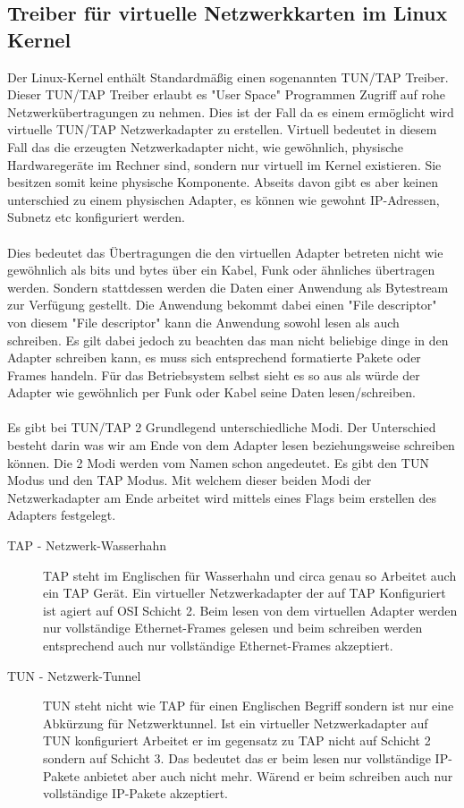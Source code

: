 \subsection{Treiber für virtuelle Netzwerkkarten im Linux Kernel}
Der Linux-Kernel enthält Standardmäßig einen sogenannten TUN/TAP Treiber. Dieser TUN/TAP Treiber erlaubt es "User Space" Programmen Zugriff auf rohe Netzwerkübertragungen zu nehmen. Dies ist der Fall da es einem ermöglicht wird virtuelle TUN/TAP Netzwerkadapter zu erstellen.
Virtuell bedeutet in diesem Fall das die erzeugten Netzwerkadapter nicht, wie gewöhnlich, physische Hardwaregeräte im Rechner sind, sondern nur virtuell im Kernel existieren. Sie besitzen somit keine physische Komponente. Abseits davon gibt es aber keinen unterschied zu einem physischen Adapter, es können wie gewohnt IP-Adressen, Subnetz etc konfiguriert werden.
\\\\
Dies bedeutet das Übertragungen die den virtuellen Adapter betreten nicht wie gewöhnlich als bits und bytes über ein Kabel, Funk oder ähnliches übertragen werden. Sondern stattdessen werden die Daten einer Anwendung als Bytestream zur Verfügung gestellt. Die Anwendung bekommt dabei einen "File descriptor" von diesem "File descriptor" kann die Anwendung sowohl lesen als auch schreiben. Es gilt dabei jedoch zu beachten das man nicht beliebige dinge in den Adapter schreiben kann, es muss sich entsprechend formatierte Pakete oder Frames handeln. Für das Betriebsystem selbst sieht es so aus als würde der Adapter wie gewöhnlich per Funk oder Kabel seine Daten lesen/schreiben.
\\\\
Es gibt bei TUN/TAP 2 Grundlegend unterschiedliche Modi. Der Unterschied besteht darin was wir am Ende von dem Adapter lesen beziehungsweise schreiben können. Die 2 Modi werden vom Namen schon angedeutet. Es gibt den TUN Modus und den TAP Modus. Mit welchem dieser beiden Modi der Netzwerkadapter am Ende arbeitet wird mittels eines Flags beim erstellen des Adapters festgelegt.
\\
\begin{description}
    \item[TAP - Netzwerk-Wasserhahn] TAP steht im Englischen für Wasserhahn und circa genau so Arbeitet auch ein TAP Gerät.
    Ein virtueller Netzwerkadapter der auf TAP Konfiguriert ist agiert auf OSI Schicht 2. 
    Beim lesen von dem virtuellen Adapter werden nur vollständige Ethernet-Frames gelesen und beim schreiben werden entsprechend auch nur vollständige Ethernet-Frames akzeptiert.
    \\
    \item[TUN - Netzwerk-Tunnel] TUN steht nicht wie TAP für einen Englischen Begriff sondern ist nur eine Abkürzung für Netzwerktunnel. 
    Ist ein virtueller Netzwerkadapter auf TUN konfiguriert Arbeitet er im gegensatz zu TAP nicht auf Schicht 2 sondern auf Schicht 3. Das bedeutet das er beim lesen nur vollständige IP-Pakete anbietet aber auch nicht mehr. Wärend er beim schreiben auch nur vollständige IP-Pakete akzeptiert. 
\end{description}
\

